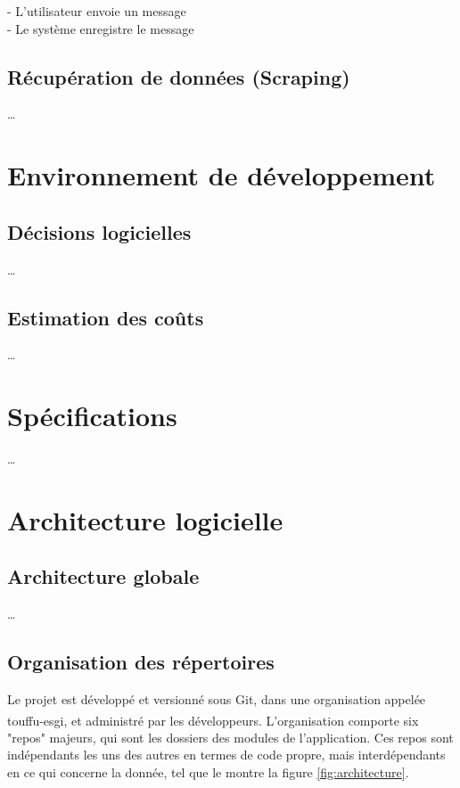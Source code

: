 \documentclass[conference]{IEEEtran}
\newcommand{\bibRef}[1]
{\textsuperscript{\cite{#1}}}
\begin{document}
- L'utilisateur envoie un message\\
- Le système enregistre le message\\

\subsection{Récupération de données (Scraping)}
…

\section{Environnement de développement}

\subsection{Décisions logicielles}
…

\subsection{Estimation des coûts}
…

\section{Spécifications}
…

\section{Architecture logicielle}

\subsection{Architecture globale}

…

\subsection{Organisation des répertoires}

Le projet est développé et versionné sous Git, dans une organisation appelée touffu-esgi\bibRef{touffu-esgi}, et administré par les développeurs. L'organisation comporte six "repos" majeurs, qui sont les dossiers des modules de l'application. Ces repos sont indépendants les uns des autres en termes de code propre, mais interdépendants en ce qui concerne la donnée, tel que le montre la figure \ref{fig:architecture}.\\
\end{document}
